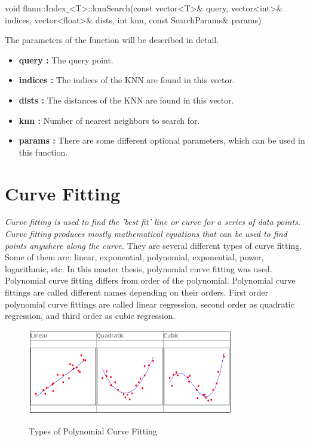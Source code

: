 \begin{center}

void flann::Index$\_$<T>::knnSearch(const vector<T>$\&$ query, vector<int>$\&$ indices, vector<float>$\&$ dists, int knn, const SearchParams$\&$ params)

\end{center}

The parameters of the function will be described in detail.\cite{k_nearest_neighbors_OpenCV}

\begin{itemize}

\item \textbf{query : }The query point.

\item \textbf{indices : }The indices of the KNN are found in this vector.

\item \textbf{dists : }The distances of the KNN are found in this vector.

\item \textbf{knn : }Number of nearest neighbors to search for.

\item \textbf{params : }There are some different optional parameters, which can be used in this function.

\end{itemize}


%
\section{Curve Fitting}\label{sec:Curve Fitting}

\emph{\color{red}Curve fitting is used to find the 'best fit' line or curve for a series of data points. Curve fitting produces mostly mathematical equations that can be used to find points anywhere along
the curve.\cite{Curve_Fitting}} They are several different types of curve fitting. Some of them are: linear, exponential, polynomial, exponential, power, logarithmic, etc. In this master thesis, polynomial curve fitting was used. Polynomial curve fitting differs from order of the polynomial. Polynomial curve fittings are called different names depending on their orders. First order polynomial curve fittings are called linear regression, second order as quadratic regression, and third order as cubic regression.


\begin{figure}[H]
 \centering
  \includegraphics[width=0.8\textwidth]{./Bilder/Curve_Fitting_Polynomial.png}\label{Curve_Fitting_Polynomial}
  \caption{Types of Polynomial Curve Fitting\cite{Curve_Fitting_Polynomial}}
\end{figure}



